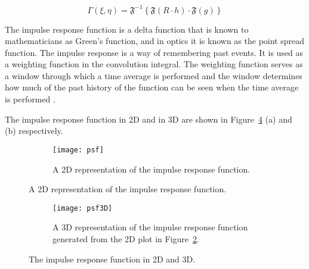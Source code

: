     \begin{equation}
        \Gamma(\xi,\eta) = \mathfrak{F}^{-1}\left\{ \mathfrak{F}(R\cdot h)
        \cdot\mathfrak{F}(g) \right\}
        \label{eq:convReconstruction}
    \end{equation}

    The impulse response function is a delta function that is known to mathematicians as Green's function,
    and in optics it is known as the point spread function. The impulse response is
    a way of remembering past events. It is used as a weighting function in the
    convolution integral. The weighting function serves as a window through which a
    time average is performed and the window determines how much of the past history
    of the function can be seen when the time average is performed
    \cite{guenther_modern_1990}.

    The impulse response function in 2D and in 3D are shown in
    Figure~\ref{fig:pointSpreadFunction} (a) and (b) respectively.

    \begin{figure}[htbp!]
        \ContinuedFloat
        \begin{center}
        \begin{subfigure}[t]{\textwidth}
            \texttt{[image: psf]}
            \caption{A 2D representation of the impulse response function.}
            \label{fig:psf}
        \end{subfigure}
        \end{center}
    \end{figure}

    \begin{figure}[htbp!]
        \ContinuedFloat
        \begin{center}
        \begin{subfigure}[t]{0.5\textwidth}
            \texttt{[image: psf3D]}
            \caption{A 3D representation of the impulse response function generated from the 2D plot in
                Figure~\ref{fig:psf}.}
            \label{fig:psf3D}
        \end{subfigure}
        \end{center}
        \caption{The impulse response function in 2D and 3D.}
        \label{fig:pointSpreadFunction}
    \end{figure}


